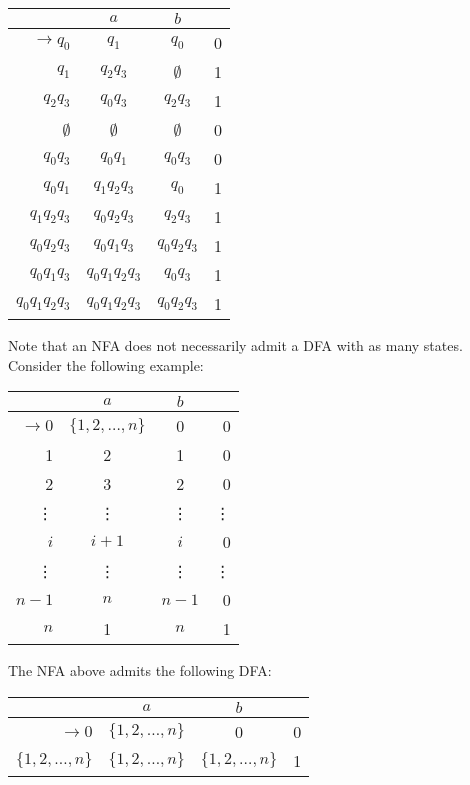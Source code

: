 \begin{center}\begin{tabular}{r c c r}
         & \(a\) & \(b\) & \\\bottomrule
    \(\to q_0\) & \(q_1\) & \(q_0\) & 0 \\
          \(q_1\) & \(q_2q_3\) & \(\emptyset \) & 1 \\
          \(q_2q_3\) & \(q_0q_3\) & \(q_2q_3\) & 1 \\
          \(\emptyset \) & \(\emptyset \) & \(\emptyset \) & 0\\
          \(q_0q_3\) & \(q_0q_1\) & \(q_0q_3\) & 0 \\
          \(q_0q_1\) & \(q_1q_2q_3\) & \(q_0\) & 1 \\
          \(q_1q_2q_3\) & \(q_0q_2q_3\) & \(q_2q_3\) & 1 \\
          \(q_0q_2q_3\) & \(q_0q_1q_3\) & \(q_0q_2q_3\) & 1 \\
          \(q_0q_1q_3\) & \(q_0q_1q_2q_3\) & \(q_0q_3\) & 1 \\
          \(q_0q_1q_2q_3\) & \(q_0q_1q_2q_3\) & \(q_0q_2q_3\) & 1\\
\end{tabular}\end{center}

Note that an NFA does not necessarily admit a DFA with as many states. Consider the following example:

\begin{center}\begin{tabular}{r c c r}
     & \(a\) & \(b\) & \\\bottomrule
\(\to 0\)&\( \{1,2,\hdots,n\} \) & 0 & 0 \\
     1 & 2 & 1 & 0 \\
     2 & 3 & 2 & 0 \\
     \vdots & \vdots & \vdots & \vdots \\
     \(i\) & \(i + 1\) & \(i\) & 0 \\
     \vdots & \vdots & \vdots & \vdots \\
     \(n-1\) & \(n\) & \(n-1\) & 0 \\
     \(n\) & 1 & \(n\) & 1
\end{tabular}\end{center}

The NFA above admits the following DFA\@:

\begin{center}\begin{tabular}{r c c r}
     & \(a\) & \(b\) & \\\bottomrule
\(\to 0\)&\( \{1,2,\hdots,n\} \) & 0 & 0 \\
     \( \{1, 2,\hdots, n\} \) & \( \{1, 2,\hdots, n\} \) & \( \{1, 2,\hdots, n\} \) & 1 \\
\end{tabular}\end{center}

